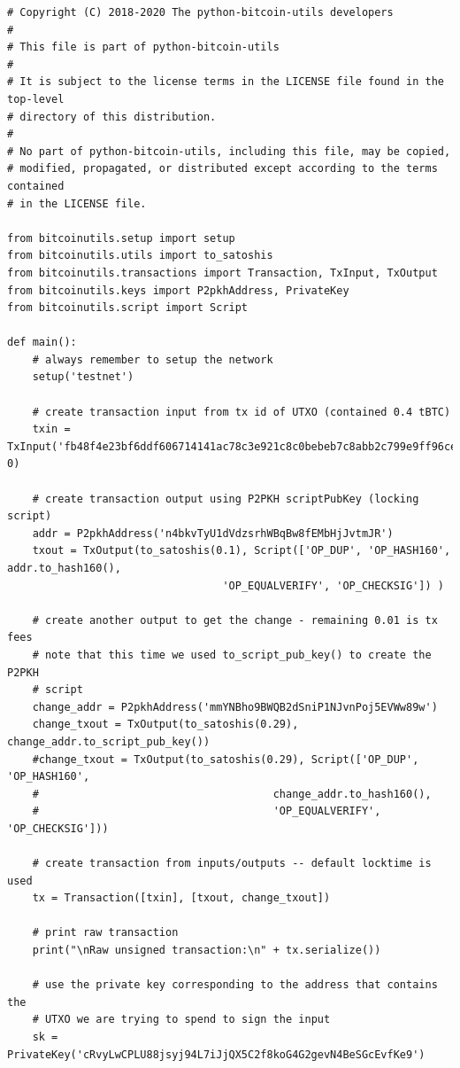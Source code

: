 \vspace{1em}
\begin{lstlisting}[style=Python]
# Copyright (C) 2018-2020 The python-bitcoin-utils developers
#
# This file is part of python-bitcoin-utils
#
# It is subject to the license terms in the LICENSE file found in the top-level
# directory of this distribution.
#
# No part of python-bitcoin-utils, including this file, may be copied,
# modified, propagated, or distributed except according to the terms contained
# in the LICENSE file.

from bitcoinutils.setup import setup
from bitcoinutils.utils import to_satoshis
from bitcoinutils.transactions import Transaction, TxInput, TxOutput
from bitcoinutils.keys import P2pkhAddress, PrivateKey
from bitcoinutils.script import Script

def main():
    # always remember to setup the network
    setup('testnet')

    # create transaction input from tx id of UTXO (contained 0.4 tBTC)
    txin = TxInput('fb48f4e23bf6ddf606714141ac78c3e921c8c0bebeb7c8abb2c799e9ff96ce6c', 0)

    # create transaction output using P2PKH scriptPubKey (locking script)
    addr = P2pkhAddress('n4bkvTyU1dVdzsrhWBqBw8fEMbHjJvtmJR')
    txout = TxOutput(to_satoshis(0.1), Script(['OP_DUP', 'OP_HASH160', addr.to_hash160(),
                                  'OP_EQUALVERIFY', 'OP_CHECKSIG']) )

    # create another output to get the change - remaining 0.01 is tx fees
    # note that this time we used to_script_pub_key() to create the P2PKH
    # script
    change_addr = P2pkhAddress('mmYNBho9BWQB2dSniP1NJvnPoj5EVWw89w')
    change_txout = TxOutput(to_satoshis(0.29), change_addr.to_script_pub_key())
    #change_txout = TxOutput(to_satoshis(0.29), Script(['OP_DUP', 'OP_HASH160',
    #                                     change_addr.to_hash160(),
    #                                     'OP_EQUALVERIFY', 'OP_CHECKSIG']))

    # create transaction from inputs/outputs -- default locktime is used
    tx = Transaction([txin], [txout, change_txout])

    # print raw transaction
    print("\nRaw unsigned transaction:\n" + tx.serialize())

    # use the private key corresponding to the address that contains the
    # UTXO we are trying to spend to sign the input
    sk = PrivateKey('cRvyLwCPLU88jsyj94L7iJjQX5C2f8koG4G2gevN4BeSGcEvfKe9')


\end{lstlisting}
